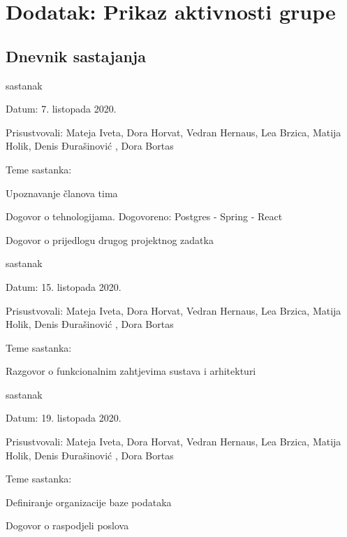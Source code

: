\chapter*{Dodatak: Prikaz aktivnosti grupe}
		
		\section*{Dnevnik sastajanja}
		
		\begin{packed_enum}
			\item  sastanak
			
			\item[] \begin{packed_item}
				\item Datum: 7. listopada 2020.
				\item Prisustvovali: Mateja Iveta, Dora Horvat, Vedran Hernaus, Lea Brzica, Matija Holik, Denis Đurašinović , Dora Bortas
				\item Teme sastanka:
				\begin{packed_item}
					\item  Upoznavanje članova tima
					\item  Dogovor o tehnologijama. Dogovoreno: Postgres - Spring - React
					\item Dogovor o prijedlogu drugog projektnog zadatka
				\end{packed_item}
			\end{packed_item}
			
			\item  sastanak
			\item[] \begin{packed_item}
				\item Datum: 15. listopada 2020.
				\item Prisustvovali:  Mateja Iveta, Dora Horvat, Vedran Hernaus, Lea Brzica, Matija Holik, Denis Đurašinović , Dora Bortas
				\item Teme sastanka:
				\begin{packed_item}
					\item  Razgovor o funkcionalnim zahtjevima sustava i arhitekturi
					
				\end{packed_item}
			\end{packed_item}
			\item  sastanak
			
			\item[] \begin{packed_item}
				\item Datum: 19. listopada 2020.
				\item Prisustvovali: Mateja Iveta, Dora Horvat, Vedran Hernaus, Lea Brzica, Matija Holik, Denis Đurašinović , Dora Bortas
				\item Teme sastanka:
				\begin{packed_item}
					\item Definiranje organizacije baze podataka
					\item Dogovor o raspodjeli poslova
				\end{packed_item}
			\end{packed_item}
		

\end{packed_enum}

